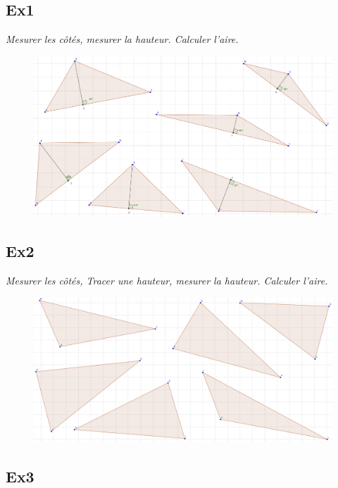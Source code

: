 \documentclass[11pt]{article}
\begin{document}
\subsection*{Ex1}

\textit{Mesurer les côtés, mesurer la hauteur. Calculer l'aire.}

\begin{figure}[H]
  \centering
  \includegraphics[width=\linewidth]{5x2-triangles/sources/hauteur-1.png}
\end{figure}

\subsection*{Ex2}

\textit{Mesurer les côtés, Tracer une hauteur, mesurer la hauteur. Calculer l'aire.}

\begin{figure}[H]
  \centering
  \includegraphics[width=\linewidth]{5x2-triangles/sources/hauteur-2.png}
\end{figure}

\newpage
\subsection*{Ex3}
\end{document}
